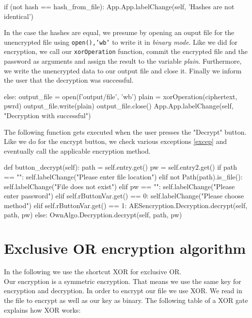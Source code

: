 \documentclass[]{article}
\begin{document}
\begin{python}
if (not hash == hash_from_file):
    App.App.labelChange(self, 'Hashes are not identical')
\end{python}

In the case the hashes are equal, we presume by opening an ouput file for the unencrypted file using 
\texttt{open(),'wb'} to write it in \textit{binary mode}. Like we did for encryption, we call our \texttt{xorOperation}
function, commit the encrypted file and the password as arguments and assign the result to the variable \textit{plain}.
Furthermore, we write the unencrypted data to our output file and close it. Finally we inform the user that the 
decryption was successful.

\begin{python}
else:
    output_file = open(f'output/{file}', 'wb')
    plain = xorOperation(ciphertext, pwrd)
    output_file.write(plain)
    output_file.close()
    App.App.labelChange(self, "Decryption with successful")
\end{python}

The following function gets executed when the user presses the "Decrypt" button. Like we do for the encrypt button,
we check various exceptions \ref{excep} and eventually call the applicable encryption method.

\begin{python}
def button_decrypt(self):
    path = self.entry.get()
    pw = self.entry2.get() 
    if path == "":
        self.labelChange("Please enter file location")
    elif not Path(path).is_file():
        self.labelChange("File does not exist")
    elif pw == "":
        self.labelChange("Please enter password")
    elif self.rButtonVar.get() == 0:
        self.labelChange("Please choose method")
    elif self.rButtonVar.get() == 1:
        AESencryption.Decryption.decrypt(self, path, pw)
    else:
        OwnAlgo.Decryption.decrypt(self, path, pw)
\end{python}


\section{Exclusive OR encryption algorithm} \label{XOR}
In the following we use the shortcut XOR for exclusive OR.\\
Our encryption is a symmetric encryption. That means we use the same key for encryption and decryption. 
In order to encrypt our file we use XOR. We read in the file to encrypt as well as our key as binary. The
following table of a XOR gate explains how XOR works:
\end{document}
